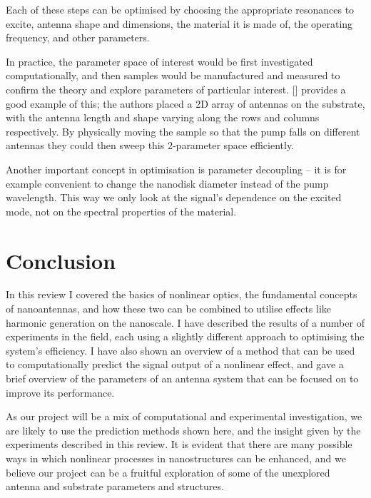\documentclass[12pt,a4paper]{article}
\newcommand{\citein}[1]{[\citen{#1}]}
\begin{document}
Each of these steps can be optimised by choosing the appropriate resonances to excite, antenna shape and dimensions, the material it is made of, the operating frequency, and other parameters.

In practice, the parameter space of interest would be first investigated computationally, and then samples would be manufactured and measured to confirm the theory and explore parameters of particular interest. \citein{obrienPredictingNonlinearProperties2015} provides a good example of this; the authors placed a 2D array of antennas on the substrate, with the antenna length and shape varying along the rows and columns respectively. By physically moving the sample so that the pump falls on different antennas they could then sweep this 2-parameter space efficiently.

Another important concept in optimisation is parameter decoupling -- it is for example convenient
to change the nanodisk diameter instead of the pump wavelength\cite{obrienPredictingNonlinearProperties2015, grinblatEnhancedThirdHarmonic2016}. This way we only look at the signal's dependence on the excited mode, not on the spectral properties of the material.

\section{Conclusion}
In this review I covered the basics of nonlinear optics, the fundamental concepts of nanoantennas, and how these two can be combined to utilise effects like harmonic generation on the nanoscale. I have described the results of a number of experiments in the field, each using a slightly different approach to optimising the system's efficiency. I have also shown an overview of a method that can be used to computationally predict the signal output of a nonlinear effect, and gave a brief overview of the parameters of an antenna system that can be focused on to improve its performance.

As our project will be a mix of computational and experimental investigation, we are likely to use the prediction methods shown here, and the insight given by the experiments described in this review. It is evident that there are many possible ways in which nonlinear processes in nanostructures can be enhanced, and we believe our project can be a fruitful exploration of some of the unexplored antenna and substrate parameters and structures.



\end{document}
